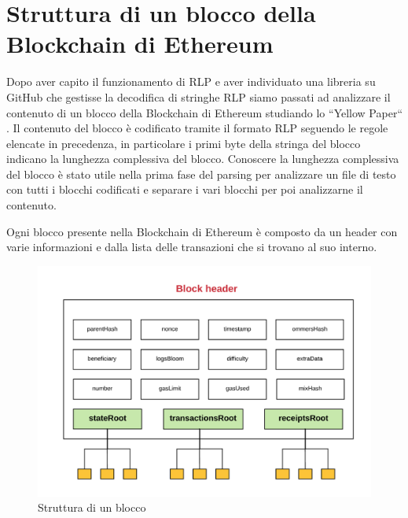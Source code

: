 \documentclass[12pt]{report}
\begin{document}
\section{Struttura di un blocco della Blockchain di Ethereum}

Dopo aver capito il funzionamento di RLP e aver individuato una libreria su GitHub che gestisse la decodifica di stringhe RLP siamo passati ad analizzare il contenuto di un blocco della Blockchain di Ethereum studiando lo ``Yellow Paper`` \cite{YellowPaper}.
Il contenuto del blocco è codificato tramite il formato RLP seguendo le regole elencate in precedenza, in particolare i primi byte della stringa del blocco indicano la lunghezza complessiva del blocco.
Conoscere la lunghezza complessiva del blocco è stato utile nella prima fase del parsing per analizzare un file di testo con tutti i blocchi codificati e separare i vari blocchi per poi analizzarne il contenuto.

Ogni blocco presente nella Blockchain di Ethereum è composto da un header con varie informazioni e dalla lista delle transazioni che si trovano al suo interno.

\begin{figure}[H]
    \includegraphics[width=\textwidth]{BlockHeader}
    \caption{Struttura di un blocco}
\end{figure}
\end{document}
